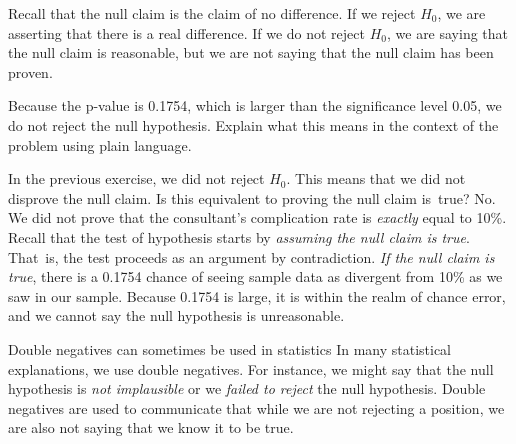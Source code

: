 Recall that the null claim is the claim of no difference. If we reject $H_0$, we are asserting that there is a real difference. If we do not reject $H_0$, we are saying that the null claim is reasonable, but we are not saying that the null claim has been proven.

\begin{exercisewrap}
\begin{nexercise} \label{plainLanguageExplanationOfHTConclusionForLiverDonorSurgicalConsultant}
Because the p-value is 0.1754, which is larger than the significance level 0.05, we do not reject the null hypothesis. Explain what this means in the context of the problem using plain language.\footnotemark
\end{nexercise}
\end{exercisewrap}

\D{\newpage}

\begin{examplewrap}
\begin{nexample}{In the previous exercise, we did not reject $H_0$. This means that we did not disprove the null claim. Is this equivalent to proving the null claim is~true?}
No. We did not prove that the consultant's complication rate is \emph{exactly} equal to 10\%. Recall that the test of hypothesis starts by \emph{assuming the null claim is true}. That~is, the test proceeds as an argument by contradiction. \emph{If the null claim is true}, there is a 0.1754 chance of seeing sample data as divergent from 10\% as we saw in our sample. Because 0.1754 is large, it is within the realm of chance error, and we cannot say the null hypothesis is unreasonable.\footnotemark
\end{nexample}
\end{examplewrap}


\begin{onebox}{Double negatives can sometimes be used in statistics}
In many statistical explanations, we use double negatives. For instance, we might say that the null hypothesis is \emph{not implausible} or we \emph{failed to reject} the null hypothesis. Double negatives are used to communicate that while we are not rejecting a position, we are also not saying that we know it to be true.\end{onebox}

